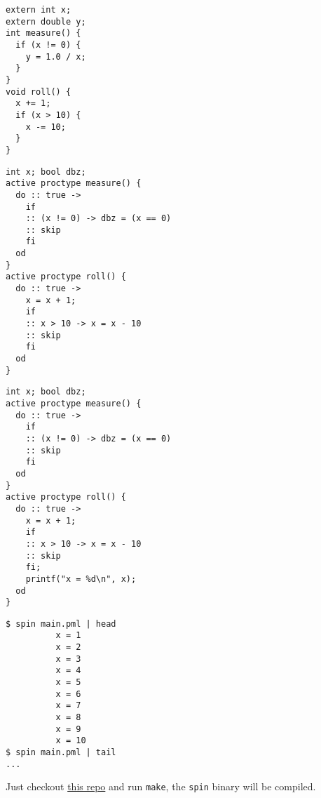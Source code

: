 \documentclass{article}
\begin{document}
\plush{}


\begin{pptWide}{2}
{\small\begin{verbatim}
extern int x;
extern double y;
int measure() {
  if (x != 0) {
    y = 1.0 / x;
  }
}
void roll() {
  x += 1;
  if (x > 10) {
    x -= 10;
  }
}
\end{verbatim}
}
\par\columnbreak\par
{\scriptsize\begin{verbatim}
int x; bool dbz;
active proctype measure() {
  do :: true ->
    if
    :: (x != 0) -> dbz = (x == 0)
    :: skip
    fi
  od
}
active proctype roll() {
  do :: true ->
    x = x + 1;
    if
    :: x > 10 -> x = x - 10
    :: skip
    fi
  od
}
\end{verbatim}
}
\end{pptWide}

\plush{}


\begin{pptWide}{2}
{\scriptsize\begin{verbatim}
int x; bool dbz;
active proctype measure() {
  do :: true ->
    if
    :: (x != 0) -> dbz = (x == 0)
    :: skip
    fi
  od
}
active proctype roll() {
  do :: true ->
    x = x + 1;
    if
    :: x > 10 -> x = x - 10
    :: skip
    fi;
    printf("x = %d\n", x);
  od
}
\end{verbatim}
}
\par\columnbreak\par
{\scriptsize\begin{verbatim}
$ spin main.pml | head
          x = 1
          x = 2
          x = 3
          x = 4
          x = 5
          x = 6
          x = 7
          x = 8
          x = 9
          x = 10
$ spin main.pml | tail
...
\end{verbatim}
}

Just checkout \href{https://github.com/nimble-code/Spin}{this repo} and run \texttt{make},
the \texttt{spin} binary will be compiled.
\end{pptWide}

\plush{}

\end{document}
